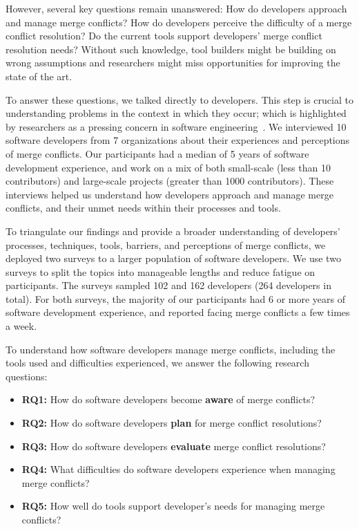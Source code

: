 However, several key questions remain unanswered: 
How do developers approach and manage merge conflicts?
How do developers perceive the difficulty of a merge conflict resolution? 
Do the current tools support developers' merge conflict resolution needs?
Without such knowledge, tool builders might be building on wrong assumptions and researchers might miss opportunities for improving the state of the art.

To answer these questions, we talked directly to developers.
This step is crucial to understanding problems in the context in which they occur; which is highlighted by researchers as a pressing concern in software engineering~\cite{fritz2010using, sillito2006questions, ko2007information}.
We interviewed 10 software developers from 7 organizations about their experiences and perceptions of merge conflicts. %
Our participants had a median of 5 years of software development experience, and work on a mix of both small-scale (less than 10 contributors) and large-scale projects (greater than 1000 contributors).
These interviews helped us understand how developers approach and manage merge conflicts, and their unmet needs within their processes and tools.

To triangulate our findings and provide a broader understanding of developers' processes, techniques, tools, barriers, and perceptions of merge conflicts, we deployed two surveys to a larger population of software developers.
We use two surveys to split the topics into manageable lengths and reduce fatigue on participants.
The surveys sampled 102 and 162 developers (264 developers in total).
For both surveys, the majority of our participants had 6 or more years of software development experience, and reported facing merge conflicts a few times a week.

To understand how software developers manage merge conflicts, including the tools used and difficulties experienced, we answer the following research questions:

\begin{itemize}[label=$\bullet$]
\item \textbf{RQ1:} How do software developers become \textbf{aware} of merge conflicts?
\item \textbf{RQ2:} How do software developers \textbf{plan} for merge conflict resolutions?
\item \textbf{RQ3:} How do software developers \textbf{evaluate} merge conflict resolutions?
\item \textbf{RQ4:} What difficulties do software developers experience when managing merge conflicts?
\item \textbf{RQ5:} How well do tools support developer's needs for managing merge conflicts?
\end{itemize}

